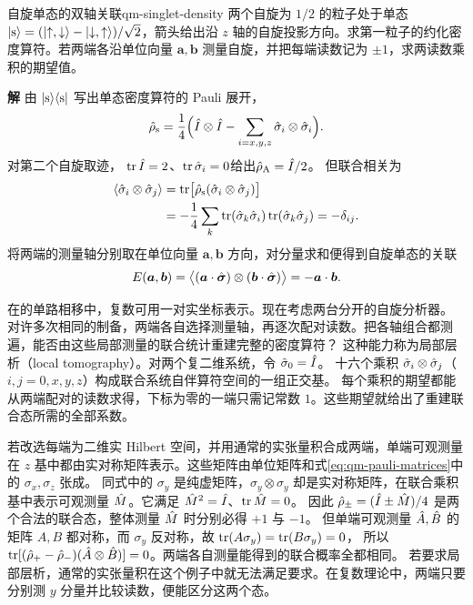 \begin{example}[unbreakable]{自旋单态的双轴关联}{qm-singlet-density}
    两个自旋为 $1/2$ 的粒子处于单态 $\lvert\mathrm{s}\rangle = (\lvert\mathord{\uparrow},\mathord{\downarrow}\rangle - \lvert\mathord{\downarrow},\mathord{\uparrow}\rangle)/\sqrt2$，箭头给出沿 $z$ 轴的自旋投影方向。求第一粒子的约化密度算符。若两端各沿单位向量 $\bm a,\bm b$ 测量自旋，并把每端读数记为 $\pm1$，求两读数乘积的期望值。
    \par\smallskip\textbf{解}\quad
    由 $\lvert\mathrm{s}\rangle\langle\mathrm{s}\rvert$ 写出单态密度算符的 Pauli 展开，
    \begin{equation}
        \hat{\rho}_{\mathrm{s}} = \frac14\Bigl(\hat{I} \otimes \hat{I}
            - \sum_{i=x,y,z}\hat{\sigma}_i \otimes \hat{\sigma}_i\Bigr).
    \end{equation}
    对第二个自旋取迹，
    $\operatorname{tr}\hat{I} = 2$、$\operatorname{tr}\hat{\sigma}_i = 0$给出$\hat{\rho}_{\mathrm{A}} = \hat{I}/2$。
    但联合相关为
    \begin{equation}
        \begin{alignedat}{1}
            \langle\hat{\sigma}_i \otimes \hat{\sigma}_j\rangle &= \operatorname{tr}\bigl[\hat{\rho}_{\mathrm{s}}(\hat{\sigma}_i \otimes \hat{\sigma}_j)\bigr]\\
            &= -\frac14\sum_k
                \operatorname{tr}(\hat{\sigma}_k\hat{\sigma}_i)\operatorname{tr}(\hat{\sigma}_k\hat{\sigma}_j)
                = -\delta_{ij}.
        \end{alignedat}
    \end{equation}
    将两端的测量轴分别取在单位向量 $\bm a,\bm b$ 方向，对分量求和便得到自旋单态的关联
    \begin{equation}
        E(\bm a,\bm b)
        = \bigl\langle(\bm a \cdot \hat{\bm{\sigma}}) \otimes (\bm b \cdot \hat{\bm{\sigma}})\bigr\rangle
        = -\bm a \cdot \bm b.
        \label{eq:singlet-correlation}
    \end{equation}
\end{example}

\label{ss:qm-local-tomography}
在的单路相移中，复数可用一对实坐标表示。现在考虑两台分开的自旋分析器。
对许多次相同的制备，两端各自选择测量轴，再逐次配对读数。把各轴组合都测遍，能否由这些局部测量的联合统计重建完整的密度算符？
这种能力称为局部层析（local tomography）\cite{hardy-wootters}。对两个复二维系统，令 $\hat{\sigma}_0 = \hat{I}$。
十六个乘积 $\hat{\sigma}_i \otimes \hat{\sigma}_j$（$i,j = 0,x,y,z$）构成联合系统自伴算符空间的一组正交基。
每个乘积的期望都能从两端配对的读数求得，下标为零的一端只需记常数 $1$。这些期望就给出了重建联合态所需的全部系数。

若改选每端为二维实 Hilbert 空间，并用通常的实张量积合成两端，单端可观测量在 $z$ 基中都由实对称矩阵表示。这些矩阵由单位矩阵和式\eqref{eq:qm-pauli-matrices}中的 $\sigma_x,\sigma_z$ 张成。
同式中的 $\sigma_y$ 是纯虚矩阵，$\sigma_y \otimes \sigma_y$ 却是实对称矩阵，在联合乘积基中表示可观测量 $\hat{M}$。它满足 $\hat{M}^2 = \hat{I}$、$\operatorname{tr}\hat{M} = 0$。
因此 $\hat{\rho}_\pm = (\hat{I} \pm \hat{M})/4$ 是两个合法的联合态，整体测量 $\hat{M}$ 时分别必得 $+1$ 与 $-1$。
但单端可观测量 $\hat{A},\hat{B}$ 的矩阵 $A,B$ 都对称，而 $\sigma_y$ 反对称，故 $\operatorname{tr}(A\sigma_y) = \operatorname{tr}(B\sigma_y) = 0$，
所以 $\operatorname{tr}[(\hat{\rho}_+ - \hat{\rho}_-)(\hat{A} \otimes \hat{B})] = 0$。两端各自测量能得到的联合概率全都相同。
若要求局部层析，通常的实张量积在这个例子中就无法满足要求。在复数理论中，两端只要分别测 $y$ 分量并比较读数，便能区分这两个态。

